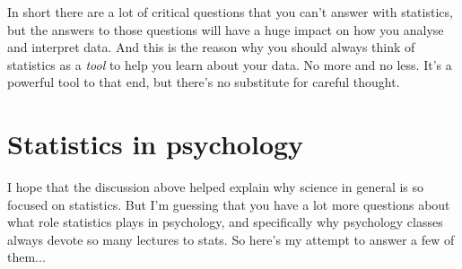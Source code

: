 In short there are a lot of critical questions that you can't answer with statistics, but the answers to those questions will have a huge impact on how you analyse and interpret data. And this is the reason why you should always think of statistics as a {\it tool} to help you learn about your data. No more and no less. It's a powerful tool to that end, but there's no substitute for careful thought.


\section{Statistics in psychology}

I hope that the discussion above helped explain why science in general is so focused on statistics. But I'm guessing that you have a lot more questions about what role statistics plays in psychology, and specifically why psychology classes always devote so many lectures to stats. So here's my attempt to answer a few of them...

